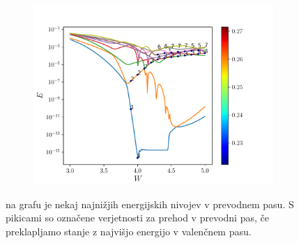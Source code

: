 \begin{figure}[!h]
\centering
\begin{subfigure}{.9\textwidth}
\includegraphics[width=\linewidth]{Figures/IzEngaStanjaWBand.pdf}
\end{subfigure}
\caption{na grafu je nekaj najnižjih energijskih nivojev v prevodnem pasu. S pikicami so označene verjetnosti za prehod v prevodni pas, če preklapljamo stanje z najvišjo energijo v valenčnem pasu.}
\label{fig:IzEngaStanjaWBand}
\end{figure}

%
